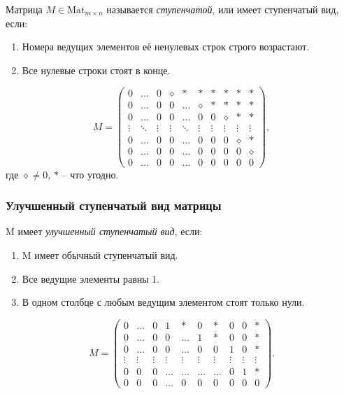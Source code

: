 \begin{definition}
    Матрица $M \in \text{Mat}_{m \times n}$ называется \textit{ступенчатой}, или имеет ступенчатый вид, если:
    \begin{enumerate}
    \item Номера ведущих элементов её ненулевых строк строго возрастают.
    \item Все нулевые строки стоят в конце.
    \end{enumerate}
\end{definition}
\begin{equation*}
    M = \begin{pmatrix}
        0 & \dots & 0 & \diamond & * & * & * & * & * & * \\
        0 & \dots & 0 & 0 & \dots & \diamond & * & * & * & * \\
        0 & \dots & 0 & 0 & \dots & 0 & 0 & \diamond & * & * \\
        \vdots & \ddots & \vdots & \vdots & \ddots & \vdots & \vdots & \vdots & \vdots & \vdots \\
        0 & \dots & 0 & 0 & \dots & 0 & 0 & 0 & \diamond & * \\
        0 & \dots & 0 & 0 & \dots & 0 & 0 & 0 & 0 & \diamond \\
        0 & \dots & 0 & 0 & \dots & 0 & 0 & 0 & 0 & 0
    \end{pmatrix}
,\end{equation*}
где $\diamond \neq 0$, $*$ -- что угодно. 


\subsubsection{Улучшенный ступенчатый вид матрицы}
\begin{definition}
    M имеет \textit{улучшенный ступенчатый вид}, если:

    \begin{enumerate}[nosep]
    \item M имеет обычный ступенчатый вид.
    \item Все ведущие элементы равны 1.
    \item В одном столбце с любым ведущим элементом стоят только нули.
    \end{enumerate}
\end{definition}

\begin{equation*}
    M = \begin{pmatrix}
        0 & \dots & 0 & 1 & * & 0 & * & 0 & 0 & * \\
        0 & \dots & 0 & 0 & \dots & 1 & * & 0 & 0 & * \\
        0 & \dots & 0 & 0 & \dots & 0 & 0 & 1 & 0 & * \\
        \vdots & \vdots & \vdots & \vdots & \vdots & \vdots & \vdots & \vdots & \vdots & \vdots \\
        0 & 0 & 0 & \dots & \dots & \dots & \dots & 0 & 1 & * \\
        0 & 0 & 0 & \dots & 0 & 0 & 0 & 0 & 0 & 0
    \end{pmatrix}
.\end{equation*}

